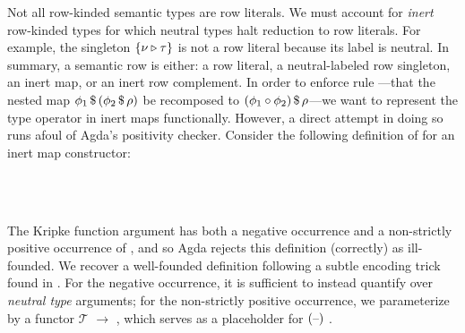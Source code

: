 \documentclass[sigplan,screen]{acmart}
\begin{document}
Not all row-kinded semantic types are row literals. We must account for \emph{inert} row-kinded types for which neutral types halt reduction to row literals. For example, the singleton $\{\nu \triangleright \tau\}$ is not a row literal because its label is neutral. In summary, a semantic row is either: a row literal, a neutral-labeled row singleton, an inert map, or an inert row complement.  In order to enforce rule ---that the nested map ${\phi_{1}} \, \mathdollar \, ({\phi_{2}} \, \mathdollar \, \rho)$ be recomposed to ${(\phi_{1} \circ \phi_{2})} \, \mathdollar \, \rho$---we want to represent the type operator in inert maps functionally. However, a direct attempt in doing so runs afoul of Agda's positivity checker. Consider the following definition of  for an inert map constructor:
\begin{AgdaAlign}
\begin{code} %
\>[0][@{}l@{\AgdaIndent{1}}]%
\>[2]\AgdaSpace{}%
\AgdaSpace{}%
\AgdaSymbol{(}\AgdaSpace{}%
\AgdaSymbol{:}\AgdaSpace{}%
\AgdaSymbol{)}\AgdaSpace{}%
\AgdaSymbol{:}\AgdaSpace{}%
\AgdaSpace{}%
\AgdaSpace{}%
\AgdaSpace{}%
\<%
\\
\>[2][@{}l@{\AgdaIndent{0}}]%
\>[4]\AgdaOperator{\AgdaInductiveConstructor{\AgdaUnderscore{}\$\AgdaUnderscore{}}}\AgdaSpace{}%
\AgdaSymbol{:}%
\>[798I]\AgdaSpace{}%
\AgdaSpace{}%
\AgdaSpace{}%
\AgdaSpace{}%
\<%
\\
\>[798I][@{}l@{\AgdaIndent{0}}]%
\>[12]\AgdaSpace{}%
\AgdaSpace{}%
\AgdaOperator{\AgdaInductiveConstructor{R[}}\AgdaSpace{}%
\AgdaSpace{}%
\AgdaOperator{\AgdaInductiveConstructor{]}}\AgdaSpace{}%
\AgdaSpace{}%
\AgdaSpace{}%
\AgdaSpace{}%
\AgdaOperator{\AgdaInductiveConstructor{R[}}\AgdaSpace{}%
\AgdaSpace{}%
\AgdaOperator{\AgdaInductiveConstructor{]}}\<%
\end{code}
\end{AgdaAlign}

The Kripke function argument has both a negative occurrence and a non-strictly positive occurrence of , and so Agda rejects this definition (correctly) as ill-founded. We recover a well-founded definition following a subtle encoding trick found in \citet{AllaisBM13}. For the negative occurrence, it is sufficient to instead quantify over \emph{neutral type} arguments; for the non-strictly positive occurrence, we parameterize  by a functor $\mathcal T$ \Symbol{:}  $\to$ , which serves as a placeholder for  $(\text{--})$ . 
\end{document}

